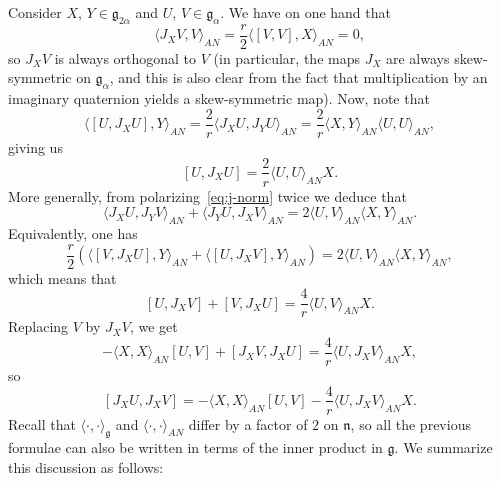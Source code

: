 \documentclass[12pt, a4paper,draft]{amsart}
\newcommand{\g}{\mathfrak}
\theoremstyle{remark}
\begin{document}
Consider $X$, $Y\in\g{g}_{2\alpha}$ and $U$, $V\in\g{g}_{\alpha}$.
We have on one hand that
\[
	\langle J_{X}V,V\rangle_{AN}=\frac{r}{2}\langle [V,V],X \rangle_{AN}=0,
\] 
so $J_{X}V$ is always orthogonal to $V$ (in particular, the maps $J_{X}$ are always skew-symmetric on $\g{g}_{\alpha}$, and this is also clear from the fact that multiplication by an imaginary quaternion yields a skew-symmetric map).
Now, note that
\[
	\langle [U,J_{X}U],Y\rangle_{AN}=\frac{2}{r}\langle J_{X}U,J_{Y}U \rangle_{AN}=\frac{2}{r}\langle X,Y\rangle_{AN}\langle U,U\rangle_{AN},
\]
giving us
\[
	[U,J_{X}U]=\frac{2}{r}\langle U,U\rangle_{AN}X.
\]
More generally, from polarizing~\eqref{eq:j-norm} twice we deduce that
\[
	\langle J_{X}U,J_{Y}V \rangle_{AN}+\langle J_{Y}U,J_{X}V\rangle_{AN}=2\langle U,V\rangle_{AN}\langle X,Y\rangle_{AN}.
\]
Equivalently, one has
\[
	\frac{r}{2}(\langle [V,J_{X}U],Y \rangle_{AN}+\langle [U,J_{X}V],Y\rangle_{AN})=2\langle U,V\rangle_{AN}\langle X,Y\rangle_{AN},
\]
which means that
\[
	[U,J_{X}V]+[V,J_{X}U]=\frac{4}{r}\langle U,V \rangle_{AN} X.
\]
Replacing $V$ by $J_{X}V$, we get
\[
	-\langle X,X\rangle_{AN} [U,V]+[J_{X}V,J_{X}U]=\frac{4}{r}\langle U,J_{X}V\rangle_{AN} X,
\]
so
\[
	[J_{X}U,J_{X}V]=-\langle X,X\rangle_{AN}[U,V]-\frac{4}{r}\langle U,J_{X}V\rangle_{AN}X.
\]
Recall that $\langle \cdot,\cdot \rangle_{\g{g}}$ and $\langle \cdot,\cdot \rangle_{AN}$ differ by a factor of $2$ on $\g{n}$, so all the previous formulae can also be written in terms of the inner product in $\g{g}$.
We summarize this discussion as follows:
\end{document}
